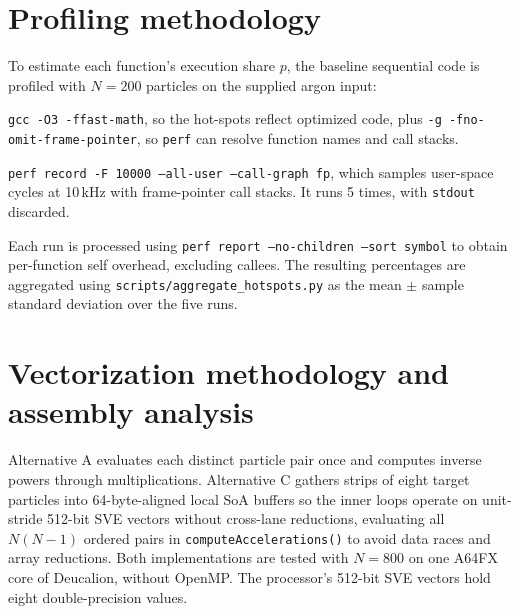 \documentclass[conference]{IEEEtran}
\begin{document}



\clearpage
\appendices
\section{Profiling methodology}
\label{app:method}
To estimate each function's execution share $p$, the baseline sequential
code is profiled with $N=200$ particles on the supplied argon input:\par
{\raggedright
\begin{IEEEdescription}
  \item[Compile:] \texttt{gcc -O3 -ffast-math}, so the hot-spots reflect
    optimized code, plus \texttt{-g -fno-omit-frame-pointer}, so
    \texttt{perf} can resolve function names and call stacks.
  \item[Record:] \texttt{perf record -F 10000 --all-user --call-graph fp},
    which samples user-space cycles at 10\,kHz with frame-pointer call
    stacks. It runs 5 times, with \texttt{stdout} discarded.
  \item[Report:] Each run is processed using
    \texttt{perf report --no-children --sort symbol} to obtain
    per-function self overhead, excluding callees. The resulting
    percentages are aggregated using
    \texttt{scripts/aggregate\_hotspots.py} as the mean
    $\pm$ sample standard deviation over the five runs.
\end{IEEEdescription}\par}

\section{Vectorization methodology and assembly analysis}
\label{app:asm}
Alternative A evaluates each distinct particle pair once and computes
inverse powers through multiplications. Alternative C gathers strips of
eight target particles into 64-byte-aligned local SoA buffers so the
inner loops operate on unit-stride 512-bit SVE vectors without
cross-lane reductions, evaluating all $N(N-1)$ ordered pairs in
\texttt{computeAccelerations()} to avoid data races and array
reductions. Both implementations are tested with $N=800$ on one A64FX
core of Deucalion, without OpenMP. The processor's 512-bit SVE vectors
hold eight double-precision values.
\end{document}
